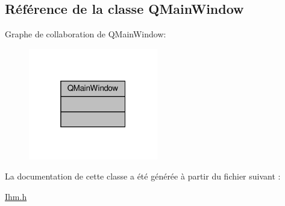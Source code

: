 \hypertarget{class_q_main_window}{}\subsection{Référence de la classe Q\+Main\+Window}
\label{class_q_main_window}


Graphe de collaboration de Q\+Main\+Window\+:
\nopagebreak
\begin{figure}[H]
\begin{center}
\leavevmode
\includegraphics[width=160pt]{class_q_main_window__coll__graph}
\end{center}
\end{figure}


La documentation de cette classe a été générée à partir du fichier suivant \+:\begin{DoxyCompactItemize}
\item 
\hyperlink{_ihm_8h}{Ihm.\+h}\end{DoxyCompactItemize}
